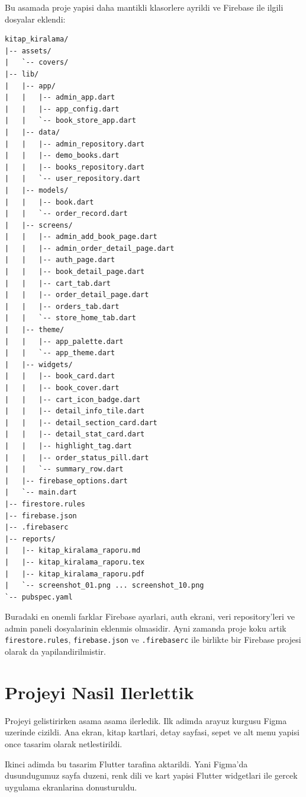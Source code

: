 \documentclass[12pt,a4paper]{article}
\begin{document}
Bu asamada proje yapisi daha mantikli klasorlere ayrildi ve Firebase ile ilgili dosyalar eklendi:

\begin{lstlisting}
kitap_kiralama/
|-- assets/
|   `-- covers/
|-- lib/
|   |-- app/
|   |   |-- admin_app.dart
|   |   |-- app_config.dart
|   |   `-- book_store_app.dart
|   |-- data/
|   |   |-- admin_repository.dart
|   |   |-- demo_books.dart
|   |   |-- books_repository.dart
|   |   `-- user_repository.dart
|   |-- models/
|   |   |-- book.dart
|   |   `-- order_record.dart
|   |-- screens/
|   |   |-- admin_add_book_page.dart
|   |   |-- admin_order_detail_page.dart
|   |   |-- auth_page.dart
|   |   |-- book_detail_page.dart
|   |   |-- cart_tab.dart
|   |   |-- order_detail_page.dart
|   |   |-- orders_tab.dart
|   |   `-- store_home_tab.dart
|   |-- theme/
|   |   |-- app_palette.dart
|   |   `-- app_theme.dart
|   |-- widgets/
|   |   |-- book_card.dart
|   |   |-- book_cover.dart
|   |   |-- cart_icon_badge.dart
|   |   |-- detail_info_tile.dart
|   |   |-- detail_section_card.dart
|   |   |-- detail_stat_card.dart
|   |   |-- highlight_tag.dart
|   |   |-- order_status_pill.dart
|   |   `-- summary_row.dart
|   |-- firebase_options.dart
|   `-- main.dart
|-- firestore.rules
|-- firebase.json
|-- .firebaserc
|-- reports/
|   |-- kitap_kiralama_raporu.md
|   |-- kitap_kiralama_raporu.tex
|   |-- kitap_kiralama_raporu.pdf
|   `-- screenshot_01.png ... screenshot_10.png
`-- pubspec.yaml
\end{lstlisting}

Buradaki en onemli farklar Firebase ayarlari, auth ekrani, veri repository'leri ve admin paneli dosyalarinin eklenmis olmasidir. Ayni zamanda proje koku artik \verb|firestore.rules|, \verb|firebase.json| ve \verb|.firebaserc| ile birlikte bir Firebase projesi olarak da yapilandirilmistir.

\section{Projeyi Nasil Ilerlettik}

Projeyi gelistirirken asama asama ilerledik. Ilk adimda arayuz kurgusu Figma uzerinde cizildi. Ana ekran, kitap kartlari, detay sayfasi, sepet ve alt menu yapisi once tasarim olarak netlestirildi.

Ikinci adimda bu tasarim Flutter tarafina aktarildi. Yani Figma'da dusundugumuz sayfa duzeni, renk dili ve kart yapisi Flutter widgetlari ile gercek uygulama ekranlarina donusturuldu.
\end{document}
